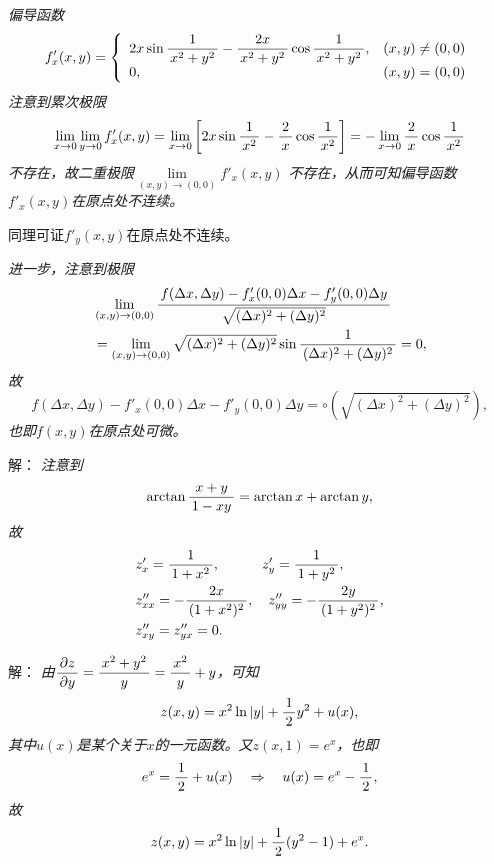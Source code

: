 \begin{frame}
	\linespread{1.5}
	
	\small \it 偏导函数
	$$f'_x(x,y)=\left\{\begin{array}{ll}
  	2x\sin\displaystyle\frac{\,{1}\,}{\,{x^2+y^2}\,}-\displaystyle\frac{\,{2x}\,}{\,{x^2+y^2}\,}\cos\displaystyle\frac{\,{1}\,}{\,{x^2+y^2}\,}, & (x,y)\ne(0,0)\\
  	0, & (x,y)=(0,0)
    \end{array}\right.$$
    注意到累次极限
	$$\lim\limits_{x\to 0}\lim\limits_{y\to 0}
	f'_x(x,y)
	=\lim\limits_{x\to 0}
	\left[2x\sin\displaystyle\frac{\,{1}\,}{\,{x^2}\,}-\displaystyle\frac{\,{2}\,}{\,{x}\,}\cos\displaystyle\frac{\,{1}\,}{\,{x^2}\,}\right]
	=-\lim\limits_{x\to 0}
	\displaystyle\frac{\,{2}\,}{\,{x}\,}\cos\displaystyle\frac{\,{1}\,}{\,{x^2}\,}$$
	不存在，故二重极限$\lim\limits_{(x,y)\to(0,0)}f'_x(x,y)$
	不存在，从而可知偏导函数$f'_x(x,y)$在原点处不连续。
	
	同理可证$f'_y(x,y)$在原点处不连续。
\end{frame}

\begin{frame}
	\linespread{1.5}
	
	\small \it 进一步，注意到极限
	\begin{align*}
		&\lim\limits_{(x,y)\to(0,0)}\displaystyle\frac{\,{f(\Delta x,\Delta y)-f'_x(0,0)\Delta x
		-f'_y(0,0)\Delta y}\,}{\,{\sqrt{(\Delta x)^2+(\Delta y)^2}}\,}\\
		&=\lim\limits_{(x,y)\to(0,0)}\sqrt{(\Delta x)^2+(\Delta y)^2}
		\sin\displaystyle\frac{\,{1}\,}{\,{(\Delta x)^2+(\Delta y)^2}\,}=0,
	\end{align*}
	故
	$$f(\Delta x,\Delta y)-f'_x(0,0)\Delta x-f'_y(0,0)\Delta y
	=\circ(\sqrt{(\Delta x)^2+(\Delta y)^2}),$$
	也即$f(x,y)$在原点处可微。\fin
	
\end{frame}

\begin{frame}
	\linespread{1.5}
	\pause

	\small 解：\it
	注意到
	$$\arctan\displaystyle\frac{\,{x+y}\,}{\,{1-xy}\,}=\arctan x+\arctan y,$$
	故
	\begin{align*}
		&z'_x=\displaystyle\frac{\,{1}\,}{\,{1+x^2}\,},\quad\quad\quad
		z'_y=\displaystyle\frac{\,{1}\,}{\,{1+y^2}\,},\\
		&z''_{xx}=-\displaystyle\frac{\,{2x}\,}{\,{(1+x^2)^2}\,},\quad
		z''_{yy}=-\displaystyle\frac{\,{2y}\,}{\,{(1+y^2)^2}\,},\\
		&z''_{xy}=z''_{yx}=0.
	\end{align*}
	\fin
\end{frame}

\begin{frame}
	\linespread{1.5}
	\pause

	\small 解：\it
	由$\displaystyle\frac{\,{\partial z}\,}{\,{\partial y}\,}=\displaystyle\frac{\,{x^2+y^2}\,}{\,{y}\,}=\displaystyle\frac{\,{x^2}\,}{\,{y}\,}+y$，可知
	$$z(x,y)=x^2\ln|y|+\displaystyle\frac{\,{1}\,}{\,{2}\,}y^2+u(x),$$
	其中$u(x)$是某个关于$x$的一元函数。又$z(x,1)=e^x$，也即
	$$e^x=\displaystyle\frac{\,{1}\,}{\,{2}\,}+u(x)\quad
	\Rightarrow\quad u(x)=e^x-\displaystyle\frac{\,{1}\,}{\,{2}\,},$$
	故
	$$z(x,y)=x^2\ln|y|+\displaystyle\frac{\,{1}\,}{\,{2}\,}(y^2-1)+e^x.$$
	\fin
\end{frame}

